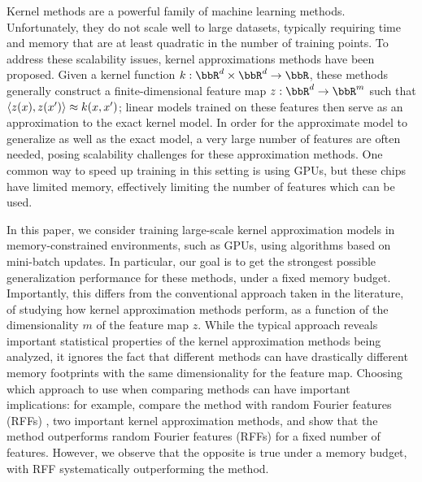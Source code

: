 
Kernel methods are a powerful family of machine learning methods.  Unfortunately, they do not scale well to large datasets, typically requiring time and memory that are at least quadratic in the number of training points. To address these scalability issues, kernel approximations methods have been proposed. Given a kernel function $k:\RR^d\times\RR^d\rightarrow \RR$, these methods generally construct a finite-dimensional feature map $z: \RR^d \rightarrow \RR^m$ such that $\langle z(x),z(x') \rangle \approx k(x,x')$; linear models trained on these features then serve as an approximation to the exact kernel model. In order for the approximate model to generalize as well as the exact model, a very large number of features are often needed, posing scalability challenges for these approximation methods. One common way to speed up training in this setting is using GPUs, but these chips have limited memory, effectively limiting the number of features which can be used. 

In this paper, we consider training large-scale kernel approximation models in memory-constrained environments, such as GPUs, using algorithms based on mini-batch updates. In particular, our goal is to get the strongest possible generalization performance for these methods, under a fixed memory budget.  Importantly, this differs from the conventional approach taken in the literature, of studying how kernel approximation methods perform, as a function of the dimensionality $m$ of the feature map $z$. While the typical approach reveals important statistical properties of the kernel approximation methods being analyzed, it ignores the fact that different methods can have drastically different memory footprints with the same dimensionality for the feature map. Choosing which approach to use when comparing methods can have important implications: for example, \citet{nysvsrff12} compare the \Nystrom method \citep{nystrom} with random Fourier features (RFFs) \citep{rahimi07random}, two important kernel approximation methods, and show that the \Nystrom method \citep{nystrom} outperforms random Fourier features (RFFs) \citep{rahimi07random} for a fixed number of features.  However, we observe that the opposite is true under a memory budget, with RFF systematically outperforming the \Nystrom method. 

